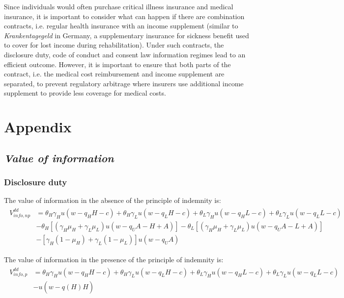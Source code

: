 \documentclass[nonatbib,preprint,12pt]{elsarticle}
\theoremstyle{plain}
\theoremstyle{definition}
\theoremstyle{plain}
\theoremstyle{TheoremNum}
\theoremstyle{CorollaryNum}
\theoremstyle{PropositionNum}
\theoremstyle{TheoremNum}
\begin{document}
Since individuals would often purchase critical illness insurance and medical insurance, it is important to consider what can happen if there are combination contracts, i.e. regular health insurance with an income supplement (similar to \textit{Krankentagegeld} in Germany, a supplementary insurance for sickness benefit used to cover for lost income during rehabilitation). Under such contracts, the disclosure duty, code of conduct and consent law information regimes lead to an efficient outcome. However, it is important to ensure that both parts of the contract, i.e. the medical cost reimbursement and income supplement are separated, to prevent regulatory arbitrage where insurers use additional income supplement to provide less coverage for medical costs. 

\newpage

\printbibliography[title = {References}]

\appendix
\section*{Appendix}

\subsection*{\emph{Value of information}}

\subsubsection*{Disclosure duty}

The value of information in the absence of the principle of indemnity is:
\begin{align}
\begin{split}
    V_{info,np}^{dd} & = \theta_H \gamma_H u(w-q_H H-c) + \theta_H \gamma_L u(w-q_L H-c) + \theta_L \gamma_H u(w-q_H L-c) + \theta_L \gamma_L u(w-q_L L-c) \\
    & - \theta_H [(\gamma_H \mu_H + \gamma_L \mu_L)u(w-q_U A - H + A)] - \theta_L [(\gamma_H \mu_H + \gamma_L \mu_L)u(w-q_U A - L + A)] \\
    & - [\gamma_H (1-\mu_H) + \gamma_L (1-\mu_L)]u(w-q_U A)
\end{split}
\end{align}

The value of information in the presence of the principle of indemnity is:
\begin{align}
\begin{split}
    V_{info,p}^{dd} & = \theta_H \gamma_H u(w-q_H H-c) + \theta_H \gamma_L u(w-q_L H-c) + \theta_L \gamma_H u(w-q_H L-c) + \theta_L \gamma_L u(w-q_L L-c) \\
    & - u(w-\widehat{q(H)}H)
\end{split}
\end{align}
\end{document}
